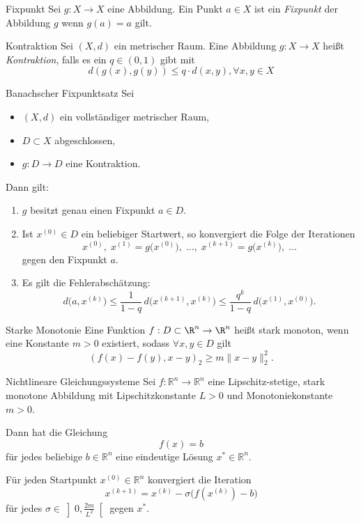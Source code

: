 \begin{definition}{Fixpunkt}
     Sei $g : X \to X$ eine Abbildung. Ein Punkt $a \in X$ ist ein \emph{Fixpunkt} der Abbildung $g$ wenn $g(a) = a$ gilt.   
\end{definition}

\begin{definition}{Kontraktion}
    Sei $(X, d)$ ein metrischer Raum. Eine Abbildung $g : X \to X$ heißt \emph{Kontraktion}, falls es ein $q  \in (0, 1)$ gibt mit
    $$
        d(g(x), g(y)) \le q \cdot d(x, y), \forall x, y \in X
    $$
\end{definition}

\begin{satz}{Banachscher Fixpunktsatz}
    Sei
    \begin{itemize}
    \item $(X,d)$ ein vollständiger metrischer Raum,
    \item $D\subset X$ abgeschlossen,
    \item $g:D\to D$ eine Kontraktion.
    \end{itemize}

    Dann gilt:
    \begin{enumerate}%
    \item $g$ besitzt genau einen Fixpunkt $a\in D$.
    \item Ist $x^{(0)}\in D$ ein beliebiger Startwert, so konvergiert die Folge der Iterationen
    $$
    x^{(0)},\; x^{(1)}=g\bigl(x^{(0)}\bigr),\; \ldots,\; x^{(k+1)}=g\bigl(x^{(k)}\bigr),\; \ldots
    $$
    gegen den Fixpunkt $a$.
    \item Es gilt die Fehlerabschätzung:
    $$
    d\bigl(a,x^{(k)}\bigr)\le \frac{1}{1-q}\,d\bigl(x^{(k+1)},x^{(k)}\bigr)
    \le \frac{q^{k}}{1-q}\,d\bigl(x^{(1)},x^{(0)}\bigr).
    $$
    \end{enumerate}
\end{satz}

\begin{definition}{Starke Monotonie}
    Eine Funktion $f : D \subset \R^n \to \R^n$ heißt stark monoton, wenn eine Konstante $m > 0$ existiert, sodass $\forall x, y \in D$ gilt
    $$
        (f(x) - f(y), x - y)_2 \ge m \|x - y\|_2^2.
    $$
\end{definition}

\begin{satz}{Nichtlineare Gleichungssysteme}
    Sei $f:\mathbb{R}^n\to\mathbb{R}^n$ eine Lipschitz-stetige, stark monotone Abbildung mit Lipschitzkonstante $L>0$ und Monotoniekonstante $m>0$.

    Dann hat die Gleichung
    $$
    f(x)=b
    $$
    für jedes beliebige $b\in\mathbb{R}^n$ eine eindeutige Lösung $x^*\in\mathbb{R}^n$.

    Für jeden Startpunkt $x^{(0)}\in\mathbb{R}^n$ konvergiert die Iteration
    $$
    x^{(k+1)}=x^{(k)}-\sigma\bigl(f(x^{(k)})-b\bigr)
    $$
    für jedes $\sigma\in\left]0,\frac{2m}{L^2}\right[$ gegen $x^*$.   
\end{satz}